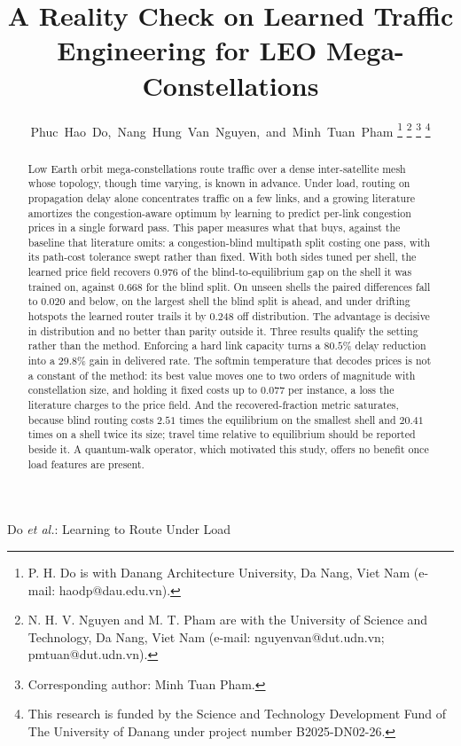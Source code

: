 \documentclass[journal]{IEEEtran}
\begin{document}
\title{A Reality Check on Learned Traffic Engineering for LEO Mega-Constellations}

\author{Phuc~Hao~Do,~Nang~Hung~Van~Nguyen,~and~Minh~Tuan~Pham%
\thanks{P. H. Do is with Danang Architecture University, Da Nang, Viet Nam
(e-mail: haodp@dau.edu.vn).}%
\thanks{N. H. V. Nguyen and M. T. Pham are with the University of Science and
Technology, Da Nang, Viet Nam (e-mail: nguyenvan@dut.udn.vn; pmtuan@dut.udn.vn).}%
\thanks{Corresponding author: Minh Tuan Pham.}%
\thanks{This research is funded by the Science and Technology Development Fund of The
University of Danang under project number B2025-DN02-26.}}

%
{Do \MakeLowercase{\textit{et al.}}: Learning to Route Under Load}

\maketitle

\begin{abstract}
Low Earth orbit mega-constellations route traffic over a dense inter-satellite mesh whose topology,
though time varying, is known in advance. Under load, routing on propagation delay alone
concentrates traffic on a few links, and a growing literature amortizes the congestion-aware
optimum by learning to predict per-link congestion prices in a single forward pass. This paper
measures what that buys, against the baseline that literature omits: a congestion-blind multipath
split costing one pass, with its path-cost tolerance swept rather than fixed. With both sides tuned
per shell, the learned price field recovers $0.976$ of the blind-to-equilibrium gap on the shell it was trained on, against $0.668$ for the blind split. On unseen shells the paired differences fall to $0.020$ and below, on the largest shell the blind split is ahead, and under drifting hotspots the learned router trails it by $0.248$ off distribution. The advantage is decisive in distribution
and no better than parity outside it. Three results qualify the setting rather than the method.
Enforcing a hard link capacity turns a $80.5\%$ delay reduction into a $29.8\%$ gain in delivered rate. The softmin temperature that decodes prices is not a constant of the method: its best value
moves one to two orders of magnitude with constellation size, and holding it fixed costs up to $0.077$ per instance, a loss the literature charges to the price field. And the recovered-fraction
metric saturates, because blind routing costs $2.51$ times the equilibrium on the smallest shell
and $20.41$ times on a shell twice its size; travel time relative to equilibrium should be reported
beside it. A quantum-walk operator, which motivated this study, offers no benefit once load
features are present.
\end{abstract}
\end{document}
